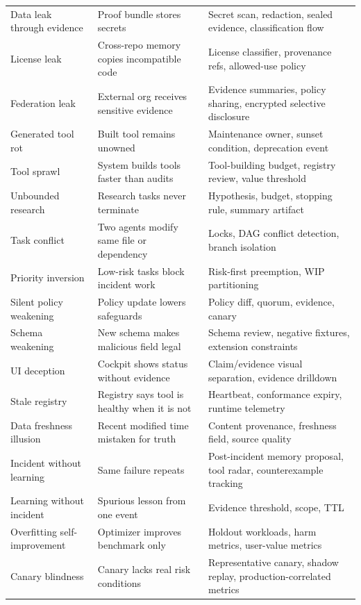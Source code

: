 \documentclass[journal,onecolumn]{IEEEtran}
\begin{document}
\begin{longtable}{p{}p{}p{}}
Data leak through evidence & Proof bundle stores secrets & Secret scan, redaction, sealed evidence, classification flow\\
License leak & Cross-repo memory copies incompatible code & License classifier, provenance refs, allowed-use policy\\
Federation leak & External org receives sensitive evidence & Evidence summaries, policy sharing, encrypted selective disclosure\\
Generated tool rot & Built tool remains unowned & Maintenance owner, sunset condition, deprecation event\\
Tool sprawl & System builds tools faster than audits & Tool-building budget, registry review, value threshold\\
Unbounded research & Research tasks never terminate & Hypothesis, budget, stopping rule, summary artifact\\
Task conflict & Two agents modify same file or dependency & Locks, DAG conflict detection, branch isolation\\
Priority inversion & Low-risk tasks block incident work & Risk-first preemption, WIP partitioning\\
Silent policy weakening & Policy update lowers safeguards & Policy diff, quorum, evidence, canary\\
Schema weakening & New schema makes malicious field legal & Schema review, negative fixtures, extension constraints\\
UI deception & Cockpit shows status without evidence & Claim/evidence visual separation, evidence drilldown\\
Stale registry & Registry says tool is healthy when it is not & Heartbeat, conformance expiry, runtime telemetry\\
Data freshness illusion & Recent modified time mistaken for truth & Content provenance, freshness field, source quality\\
Incident without learning & Same failure repeats & Post-incident memory proposal, tool radar, counterexample tracking\\
Learning without incident & Spurious lesson from one event & Evidence threshold, scope, TTL\\
Overfitting self-improvement & Optimizer improves benchmark only & Holdout workloads, harm metrics, user-value metrics\\
Canary blindness & Canary lacks real risk conditions & Representative canary, shadow replay, production-correlated metrics\\

\end{longtable}
\end{document}
